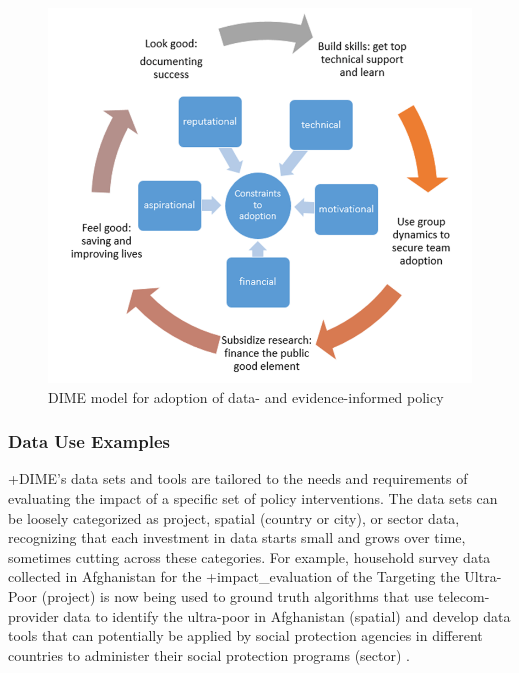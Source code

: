 \documentclass[
]{WileySix}
\begin{document}
\begin{figure}
\includegraphics[width=1\linewidth]{./assets/dime/dimefigure2web} \caption{DIME model for adoption of data- and evidence-informed policy}\label{fig:dimefigure2}
\end{figure}

\hypertarget{data-use-examples-7}{%
\subsubsection{Data Use Examples}\label{data-use-examples-7}}

+DIME\textbar's data sets and tools are tailored to the needs and requirements of evaluating the impact of a specific set of policy interventions. The data sets can be loosely categorized as project, spatial (country or city), or sector data, recognizing that each investment in data starts small and grows over time, sometimes cutting across these categories. For example, household survey data collected in Afghanistan for the +impact\_evaluation\textbar{} of the Targeting the Ultra-Poor (project) is now being used to ground truth algorithms that use telecom-provider data to identify the ultra-poor in Afghanistan (spatial) and develop data tools that can potentially be applied by social protection agencies in different countries to administer their social protection programs (sector) \citep[see][]{aiken2020}.
\end{document}
